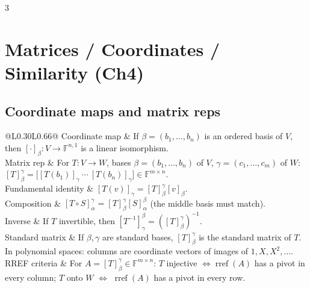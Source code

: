 \documentclass[10pt]{article}
\makeatletter
\newcommand{\F}{\mathbb{F}}
\newcommand{\cheattable}[1]{\begin{tabular}{@{}L{0.30\columnwidth}L{0.66\columnwidth}@{}}#1\end{tabular}}
\makeatother
\begin{document}
\begin{multicols}{3}
\section*{Matrices / Coordinates / Similarity (Ch4)}

\subsection*{Coordinate maps and matrix reps}
\cheattable{
Coordinate map & If $\beta=(b_1,\dots,b_n)$ is an ordered basis of $V$, then $[\cdot]_\beta:V\to\F^{n,1}$ is a linear isomorphism.\\
Matrix rep & For $T:V\to W$, bases $\beta=(b_1,\dots,b_n)$ of $V$, $\gamma=(c_1,\dots,c_m)$ of $W$: $[T]^\gamma_\beta=\bigl[[T(b_1)]_\gamma\ \cdots\ [T(b_n)]_\gamma\bigr]\in\F^{m\times n}$.\\
Fundamental identity & $[T(v)]_\gamma=[T]^\gamma_\beta[v]_\beta$.\\
Composition & $[T\circ S]^\gamma_\alpha=[T]^\gamma_\beta[S]^\beta_\alpha$ (the middle basis must match).\\
Inverse & If $T$ invertible, then $[T^{-1}]^\beta_\gamma=([T]^\gamma_\beta)^{-1}$.\\
Standard matrix & If $\beta,\gamma$ are standard bases, $[T]^\gamma_\beta$ is the standard matrix of $T$. In polynomial spaces: columns are coordinate vectors of images of $1,X,X^2,\dots$.\\
RREF criteria & For $A=[T]^\gamma_\beta\in\F^{m\times n}$: $T$ injective $\iff \operatorname{rref}(A)$ has a pivot in every column; $T$ onto $W$ $\iff$ $\operatorname{rref}(A)$ has a pivot in every row.\\
}


\end{multicols}
\end{document}
